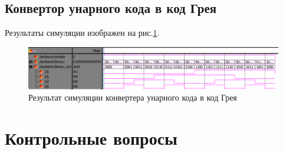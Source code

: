 \documentclass[a4paper,14pt]{article}
\begin{document}
\subsection{Конвертор унарного кода в код Грея}


Результаты симуляции изображен на рис.\ref{fig:gray_sim}.
\begin{figure}[H]
	\centering
	\includegraphics[width=0.9\linewidth]{imgs/gray_sim}
	\caption{Результат симуляции конвертера унарного кода в код Грея}
	\label{fig:gray_sim}
\end{figure}
 
\section{Контрольные вопросы}
\end{document}
